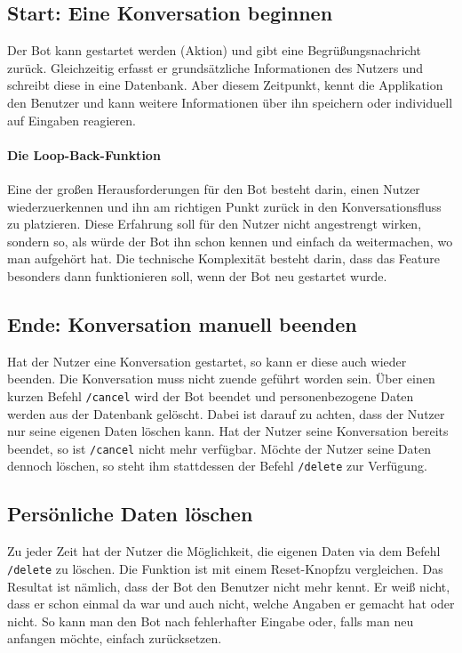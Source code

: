         \subsection{Start: Eine Konversation beginnen}
            Der Bot kann gestartet werden (Aktion) und gibt eine Begrüßungsnachricht zurück. Gleichzeitig erfasst er grundsätzliche Informationen des Nutzers und schreibt diese in eine Datenbank. Aber diesem Zeitpunkt, kennt die Applikation den Benutzer und kann weitere Informationen über ihn speichern oder individuell auf Eingaben reagieren.

            \paragraph{Die Loop-Back-Funktion}
                Eine der großen Herausforderungen für den Bot besteht darin, einen Nutzer wiederzuerkennen und ihn am richtigen Punkt zurück in den Konversationsfluss zu platzieren. Diese Erfahrung soll für den Nutzer nicht angestrengt wirken, sondern so, als würde der Bot ihn schon kennen und einfach da weitermachen, wo man aufgehört hat. Die technische Komplexität besteht darin, dass das Feature besonders dann funktionieren soll, wenn der Bot neu gestartet wurde.

        \subsection{Ende: Konversation manuell beenden}
            Hat der Nutzer eine Konversation gestartet, so kann er diese auch wieder beenden. Die Konversation muss nicht zuende geführt worden sein. Über einen kurzen Befehl \verb|/cancel| wird der Bot beendet und personenbezogene Daten werden aus der Datenbank gelöscht. Dabei ist darauf zu achten, dass der Nutzer nur seine eigenen Daten löschen kann. Hat der Nutzer seine Konversation bereits beendet, so ist \verb|/cancel| nicht mehr verfügbar. Möchte der Nutzer seine Daten dennoch löschen, so steht ihm stattdessen der Befehl \verb|/delete| zur Verfügung.

        \subsection{Persönliche Daten löschen}
            Zu jeder Zeit hat der Nutzer die Möglichkeit, die eigenen Daten via dem Befehl \verb|/delete| zu löschen. Die Funktion ist mit einem \glqq Reset-Knopf\grqq  zu vergleichen. Das Resultat ist nämlich, dass der Bot den Benutzer nicht mehr kennt. Er weiß nicht, dass er schon einmal da war und auch nicht, welche Angaben er gemacht hat oder nicht. So kann man den Bot nach fehlerhafter Eingabe oder, falls man neu anfangen möchte, einfach zurücksetzen.

